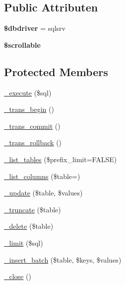 \subsection*{Public Attributen}
\begin{DoxyCompactItemize}
\item 
\mbox{\label{class_c_i___d_b__sqlsrv__driver_a0cde2a16322a023d040aa7f725877597}} 
{\bfseries \$dbdriver} = \textquotesingle{}sqlsrv\textquotesingle{}
\item 
\mbox{\label{class_c_i___d_b__sqlsrv__driver_a76095eacf021915db9aabc44ecf58555}} 
{\bfseries \$scrollable}
\end{DoxyCompactItemize}
\subsection*{Protected Members}
\begin{DoxyCompactItemize}
\item 
\mbox{\hyperlink{class_c_i___d_b__sqlsrv__driver_a114ab675d89bf8324a41785fb475e86d}{\+\_\+execute}} (\$sql)
\item 
\mbox{\hyperlink{class_c_i___d_b__sqlsrv__driver_ac81ac882c1d54347d810199a15856aac}{\+\_\+trans\+\_\+begin}} ()
\item 
\mbox{\hyperlink{class_c_i___d_b__sqlsrv__driver_a6fe7f373e0b11cfae23a5f41c0b35dda}{\+\_\+trans\+\_\+commit}} ()
\item 
\mbox{\hyperlink{class_c_i___d_b__sqlsrv__driver_ad49a116b0776c26b53114c9093fd102a}{\+\_\+trans\+\_\+rollback}} ()
\item 
\mbox{\hyperlink{class_c_i___d_b__sqlsrv__driver_a435c0f3ce54fe7daa178baa8532ebd54}{\+\_\+list\+\_\+tables}} (\$prefix\+\_\+limit=F\+A\+L\+SE)
\item 
\mbox{\hyperlink{class_c_i___d_b__sqlsrv__driver_a7ccb7f9c301fe7f0a9db701254142b63}{\+\_\+list\+\_\+columns}} (\$table=\textquotesingle{}\textquotesingle{})
\item 
\mbox{\hyperlink{class_c_i___d_b__sqlsrv__driver_a2540b03a93fa73ae74c10d0e16fc073e}{\+\_\+update}} (\$table, \$values)
\item 
\mbox{\hyperlink{class_c_i___d_b__sqlsrv__driver_aa029600528fc1ce660a23ff4b4667f95}{\+\_\+truncate}} (\$table)
\item 
\mbox{\hyperlink{class_c_i___d_b__sqlsrv__driver_a133ea8446ded52589bd22cc9163d0896}{\+\_\+delete}} (\$table)
\item 
\mbox{\hyperlink{class_c_i___d_b__sqlsrv__driver_a3a02ea06541b8ecc25a33a61651562c8}{\+\_\+limit}} (\$sql)
\item 
\mbox{\hyperlink{class_c_i___d_b__sqlsrv__driver_a1978e1358c812587a46e242630365099}{\+\_\+insert\+\_\+batch}} (\$table, \$keys, \$values)
\item 
\mbox{\hyperlink{class_c_i___d_b__sqlsrv__driver_a4d9082658000e5ede8312067c6dda9db}{\+\_\+close}} ()
\end{DoxyCompactItemize}
